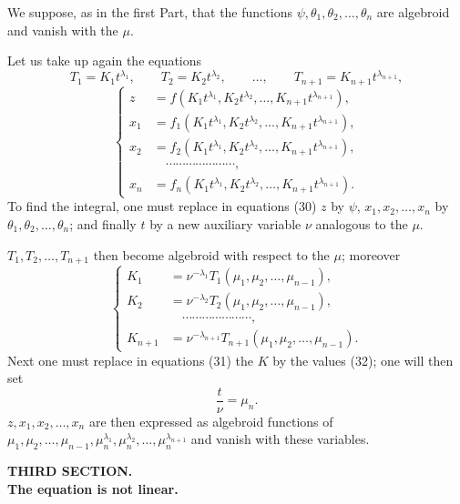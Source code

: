 \documentclass[11pt]{article}
\begin{document}
We suppose, as in the first Part, that the functions $\psi,\theta_1,\theta_2,\ldots,\theta_n$ are algebroid and vanish with the $\mu$.

Let us take up again the equations
\begin{equation*}\tag{30}
T_1=K_1t^{\lambda_1},
\qquad
T_2=K_2t^{\lambda_2},
\qquad \ldots,
\qquad
T_{n+1}=K_{n+1}t^{\lambda_{n+1}},
\end{equation*}
\begin{equation*}\tag{31}
\left\{
\begin{aligned}
z&=f(K_1t^{\lambda_1},K_2t^{\lambda_2},\ldots,K_{n+1}t^{\lambda_{n+1}}),\\
x_1&=f_1(K_1t^{\lambda_1},K_2t^{\lambda_2},\ldots,K_{n+1}t^{\lambda_{n+1}}),\\
x_2&=f_2(K_1t^{\lambda_1},K_2t^{\lambda_2},\ldots,K_{n+1}t^{\lambda_{n+1}}),\\
&\hspace{1em}\cdots\cdots\cdots\cdots\cdots\cdots\cdots,\\
x_n&=f_n(K_1t^{\lambda_1},K_2t^{\lambda_2},\ldots,K_{n+1}t^{\lambda_{n+1}}).
\end{aligned}
\right.
\end{equation*}
To find the integral, one must replace in equations (30) $z$ by $\psi$, $x_1,x_2,\ldots,x_n$ by $\theta_1,\theta_2,\ldots,\theta_n$; and finally $t$ by a new auxiliary variable $\nu$ analogous to the $\mu$.

$T_1,T_2,\ldots,T_{n+1}$ then become algebroid with respect to the $\mu$; moreover
\begin{equation*}\tag{32}
\left\{
\begin{aligned}
K_1&=\nu^{-\lambda_1}T_1(\mu_1,\mu_2,\ldots,\mu_{n-1}),\\
K_2&=\nu^{-\lambda_2}T_2(\mu_1,\mu_2,\ldots,\mu_{n-1}),\\
&\hspace{1em}\cdots\cdots\cdots\cdots\cdots\cdots\cdots,\\
K_{n+1}&=\nu^{-\lambda_{n+1}}T_{n+1}(\mu_1,\mu_2,\ldots,\mu_{n-1}).
\end{aligned}
\right.
\end{equation*}
Next one must replace in equations (31) the $K$ by the values (32); one will then set
\[
\frac{t}{\nu}=\mu_n.
\]
$z,x_1,x_2,\ldots,x_n$ are then expressed as algebroid functions of $\mu_1,\mu_2,\ldots,\mu_{n-1},\mu_n^{\lambda_1},\mu_n^{\lambda_2},\ldots,\mu_n^{\lambda_{n+1}}$ and vanish with these variables.

\begin{center}
{\bfseries THIRD SECTION.}\\[0.8em]
{\bfseries The equation is not linear.}
\end{center}
\end{document}
